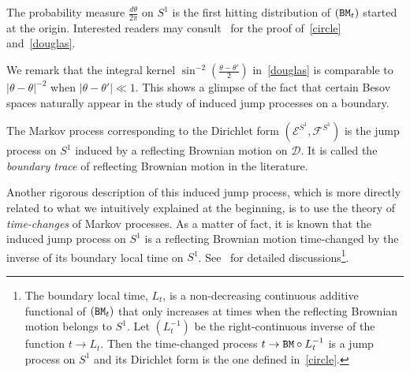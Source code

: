 \documentclass[10pt]{amsart}
\theoremstyle{definition}\newtheorem{defi}[theo]{Definition}\newtheorem{rema}[theo]{Remark}\newtheorem{exam}[theo]{Example}\newtheorem{exem}[theo]{Example}\newtheorem{nota}[theo]{Notation}
\newcommand{\ce}{\mathcal{E}}
\newcommand{\cf}{\mathcal{F}}
\newcommand{\cd}{\mathcal{D}}
\begin{document}
The probability measure $\frac{d\theta}{2\pi}$ on $S^1$ is the first hitting distribution of $({\tt BM}_t)$ started at the origin. Interested readers may consult~\cite[page 13-14]{FOT} for the proof of~\eqref{circle} and~\eqref{douglas}.

We remark that the integral kernel $\sin^{-2}(\frac{\theta-\theta'}{2})$ in~\eqref{douglas} is comparable to $|\theta-\theta|^{-2}$ when $|\theta-\theta'|\ll1$. This shows a glimpse of the fact that certain Besov spaces naturally appear in the study of induced jump processes on a boundary.

The Markov process corresponding to the Dirichlet form $(\ce^{S^1}, \cf^{S^1})$ is the jump process on $S^1$ induced by a reflecting Brownian motion on $\cd$. It is called the \emph{boundary trace} of reflecting Brownian motion in the literature.

Another rigorous description of this induced jump process, which is more directly related to what we intuitively explained at the beginning, is to use the theory of \emph{time-changes} of Markov processes. As a matter of fact, it is known that the induced jump process on $S^1$ is a reflecting Brownian motion time-changed by the inverse of its boundary local time on $S^1$. See~\cite[Section~5.3, Example~($3^{\circ}$)]{CF} for detailed discussions\footnote { The boundary local time, $L_t$, is a non-decreasing continuous additive functional of $({\tt BM}_t)$ that only increases at times when the reflecting Brownian motion belongs to $S^1$. Let $(L^{-1}_t)$ be the right-continuous inverse of the function $t\to L_t$. Then the time-changed process $t\to {\tt BM}\circ{L^{-1}_t}$ is a jump process on $S^1$ and its Dirichlet form is the one defined in~\eqref{circle}.}.
\end{document}
